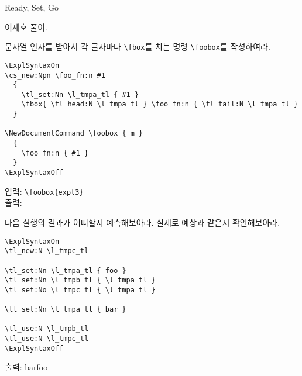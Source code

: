\documentclass[a4paper,amsmath,itemph]{oblivoir}
\begin{document}
\begin{intro}[2]
  Ready, Set, Go
\end{intro}

이재호 풀이.

\medskip

\begin{tcolorbox}[title={문제 1},fonttitle=\sffamily\bfseries]
  문자열 인자를 받아서 각 글자마다 \verb|\fbox|를 치는 명령 \verb|\foobox|를
  작성하여라.

  \tcblower

  \begin{verbatim}
\ExplSyntaxOn
\cs_new:Npn \foo_fn:n #1
  {
    \tl_set:Nn \l_tmpa_tl { #1 }
    \fbox{ \tl_head:N \l_tmpa_tl } \foo_fn:n { \tl_tail:N \l_tmpa_tl }
  }

\NewDocumentCommand \foobox { m }
  {
    \foo_fn:n { #1 }
  }
\ExplSyntaxOff
  \end{verbatim}

  \begin{tcolorbox}{}
    입력: \verb|\foobox{expl3}|\\
    출력: %
  \end{tcolorbox}

\end{tcolorbox}


\begin{tcolorbox}[title={문제 3},fonttitle=\sffamily\bfseries]
  다음 실행의 결과가 어떠할지 예측해보아라.
  실제로 예상과 같은지 확인해보아라.

  \tcblower

  \begin{verbatim}
\ExplSyntaxOn
\tl_new:N \l_tmpc_tl

\tl_set:Nn \l_tmpa_tl { foo }
\tl_set:Nn \l_tmpb_tl { \l_tmpa_tl }
\tl_set:No \l_tmpc_tl { \l_tmpa_tl }

\tl_set:Nn \l_tmpa_tl { bar }

\tl_use:N \l_tmpb_tl
\tl_use:N \l_tmpc_tl
\ExplSyntaxOff
  \end{verbatim}

  \begin{tcolorbox}{}
    출력: barfoo
  \end{tcolorbox}

\end{tcolorbox}
\end{document}
